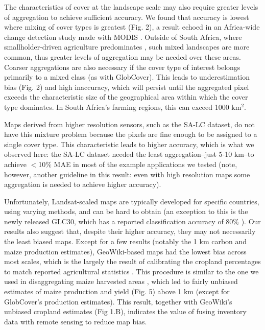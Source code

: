 \documentclass{pnastwo}
\begin{document}
\begin{article}
The characteristics of cover at the landscape scale may also require greater levels of aggregation to achieve sufficient accuracy. We found that accuracy is lowest where mixing of cover types is greatest (Fig. 2), a result echoed in an Africa-wide change detection study made with MODIS \cite{gross_monitoring_2013}. Outside of South Africa, where smallholder-driven agriculture predominates \cite{lambin_estimating_????}, such mixed landscapes are more common, thus greater levels of aggregation may be needed over these areas. Coarser aggregations are also necessary if the cover type of interest belongs primarily to a mixed class (as with GlobCover). This leads to underestimation bias (Fig. 2) and high inaccuracy, which will persist until the aggregated pixel exceeds the characteristic size of the geographical area within which the cover type dominates. In South Africa's farming regions, this can exceed 1000 km$^2$. 

Maps derived from higher resolution sensors, such as the SA-LC dataset, do not have this mixture problem because the pixels are fine enough to be assigned to a single cover type. This characteristic leads to higher accuracy, which is what we observed here: the SA-LC dataset needed the least aggregation--just 5-10 km--to achieve $<$10\% MAE in most of the example applications we tested (note, however, another guideline in this result: even with high resolution maps some aggregation is needed to achieve higher accuracy).


Unfortunately, Landsat-scaled maps are typically developed for specific countries, using varying methods, and can be hard to obtain (an exception to this is the newly released GLC30, which has a reported classification accuracy of 80\% \cite{chen_global_2015}). Our results also suggest that, despite their higher accuracy, they may not necessarily the least biased maps. Except for a few results (notably the 1 km carbon and maize production estimates), GeoWiki-based maps had the lowest bias across most scales, which is the largely the result of calibrating the cropland percentages to match reported agricultural statistics \cite{fritz_cropland_2011,fritz_mapping_2015}. This procedure is similar to the one we used in disaggregating maize harvested areas \cite{ramankutty_farming_2008, monfreda_farming_2008}, which led to fairly unbiased estimates of maize production and yield (Fig. 5) above 1 km (except for GlobCover's production estimates). This result, together with GeoWiki's unbiased cropland estimates (Fig 1.B), indicates the value of fusing inventory data with remote sensing to reduce map bias. 


\end{article}
\end{document}
